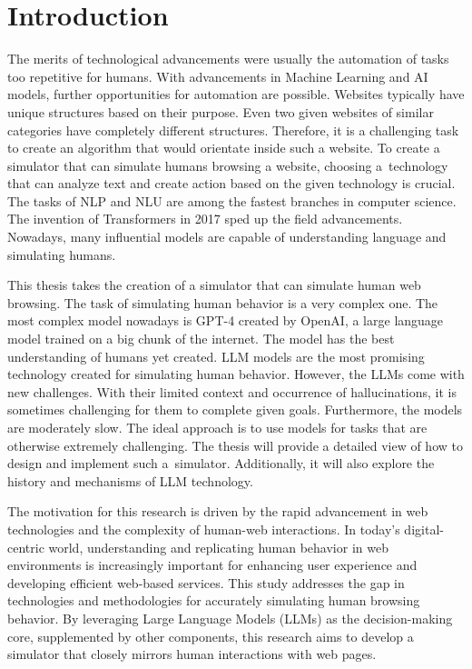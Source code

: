 \chapter{Introduction}

The merits of technological advancements were usually the automation of tasks too repetitive for humans. With advancements in Machine Learning and AI models, further opportunities for automation are possible. Websites typically have unique structures based on their purpose. Even two given websites of similar categories have completely different structures. Therefore, it is a challenging task to create an algorithm that would orientate inside such a website. To create a simulator that can simulate humans browsing a website, choosing a~technology that can analyze text and create action based on the given technology is crucial. The tasks of NLP and NLU are among the fastest branches in computer science. The invention of Transformers in 2017 \cite{attention} sped up the field advancements. Nowadays, many influential models are capable of understanding language and simulating humans. 

This thesis takes the creation of a simulator that can simulate human web browsing. The task of simulating human behavior is a very complex one. The most complex model nowadays is GPT-4 created by OpenAI, a large language model trained on a big chunk of the internet. The model has the best understanding of humans yet created. LLM models are the most promising technology created for simulating human behavior. However, the LLMs come with new challenges. With their limited context and occurrence of hallucinations, it is sometimes challenging for them to complete given goals. Furthermore, the models are moderately slow. The ideal approach is to use models for tasks that are otherwise extremely challenging. The thesis will provide a detailed view of how to design and implement such a~simulator. Additionally, it will also explore the history and mechanisms of LLM technology. 

The motivation for this research is driven by the rapid advancement in web technologies and the complexity of human-web interactions. In today's digital-centric world, understanding and replicating human behavior in web environments is increasingly important for enhancing user experience and developing efficient web-based services. This study addresses the gap in technologies and methodologies for accurately simulating human browsing behavior. By leveraging Large Language Models (LLMs) as the decision-making core, supplemented by other components, this research aims to develop a simulator that closely mirrors human interactions with web pages.

